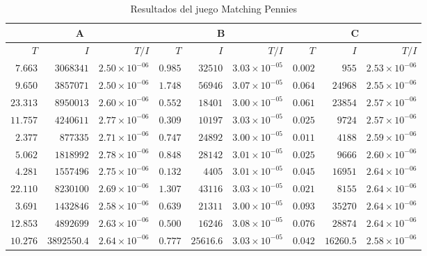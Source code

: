 \begin{table}[hbt!]
\scriptsize
    \centering
    \begin{tabular}{r r r | r r r | r r r}
    \multicolumn{3}{c}{A} & \multicolumn{3}{c}{B} & \multicolumn{3}{c}{C} \\ \hline
    $T$ & $I$ & $T/I$ & $T$ & $I$ & $T/I$ & $T$ & $I$ & $T/I$ \\  \hline
	$7.663$ & $3068341$ & $2.50 {\times} 10^{-06}$ & $0.985$ & $32510$ & $3.03 {\times} 10^{-05}$ & $0.002$ & $955$ & $2.53 {\times} 10^{-06}$ \\
	$9.650$ & $3857071$ & $2.50 {\times} 10^{-06}$ & $1.748$ & $56946$ & $3.07 {\times} 10^{-05}$ & $0.064$ & $24968$ & $2.55 {\times} 10^{-06}$ \\
	$23.313$ & $8950013$ & $2.60 {\times} 10^{-06}$ & $0.552$ & $18401$ & $3.00 {\times} 10^{-05}$ & $0.061$ & $23854$ & $2.57 {\times} 10^{-06}$ \\
	$11.757$ & $4240611$ & $2.77 {\times} 10^{-06}$ & $0.309$ & $10197$ & $3.03 {\times} 10^{-05}$ & $0.025$ & $9724$ & $2.57 {\times} 10^{-06}$ \\
	$2.377$ & $877335$ & $2.71 {\times} 10^{-06}$ & $0.747$ & $24892$ & $3.00 {\times} 10^{-05}$ & $0.011$ & $4188$ & $2.59 {\times} 10^{-06}$ \\
	$5.062$ & $1818992$ & $2.78 {\times} 10^{-06}$ & $0.848$ & $28142$ & $3.01 {\times} 10^{-05}$ & $0.025$ & $9666$ & $2.60 {\times} 10^{-06}$ \\
	$4.281$ & $1557496$ & $2.75 {\times} 10^{-06}$ & $0.132$ & $4405$ & $3.01 {\times} 10^{-05}$ & $0.045$ & $16951$ & $2.64 {\times} 10^{-06}$ \\
	$22.110$ & $8230100$ & $2.69 {\times} 10^{-06}$ & $1.307$ & $43116$ & $3.03 {\times} 10^{-05}$ & $0.021$ & $8155$ & $2.64 {\times} 10^{-06}$ \\
	$3.691$ & $1432846$ & $2.58 {\times} 10^{-06}$ & $0.639$ & $21311$ & $3.00 {\times} 10^{-05}$ & $0.093$ & $35270$ & $2.64 {\times} 10^{-06}$ \\
	$12.853$ & $4892699$ & $2.63 {\times} 10^{-06}$ & $0.500$ & $16246$ & $3.08 {\times} 10^{-05}$ & $0.076$ & $28874$ & $2.64 {\times} 10^{-06}$ \\ \hline
	$10.276$ & $3892550.4$ & $2.64 {\times} 10^{-06}$ & $0.777$ & $25616.6$ & $3.03 {\times} 10^{-05}$ & $0.042$ & $16260.5$ & $2.58 {\times} 10^{-06}$ \\ \hline
    \end{tabular}
    \caption{Resultados del juego Matching Pennies}
    \label{tab:resultados-matching-pennies}
\end{table}

